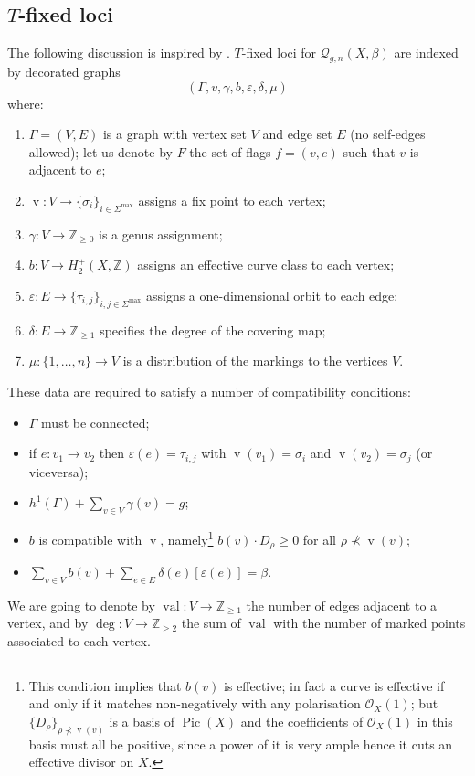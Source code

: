 \documentclass[11pt]{amsart}
\newcommand{\Q}[4]{\mathcal{Q}_{#1,#2}(#3,#4)}
\newcommand{\OO}{\mathcal{O}}
\renewcommand{\to}{\rightarrow}
\newcommand{\Pic}{\operatorname{Pic}}
\newcommand{\val}{\operatorname{val}}
\newcommand{\ZZ}{\mathbb{Z}}
\newcommand{\vv}{\operatorname{v}}
\theoremstyle{definition}
\theoremstyle{definition}
\begin{document}
\subsection{$T$-fixed loci}
The following discussion is inspired by \cite[\S 7.3]{MOP}. $T$-fixed loci for $\Q{g}{n}{X}{\beta}$ are indexed by decorated graphs
\[ \left(\Gamma, v, \gamma, b,\varepsilon,\delta,\mu\right) \]
where:
\begin{enumerate}
 \item $\Gamma=(V,E)$ is a graph with vertex set $V$ and edge set $E$ (no self-edges allowed); let us denote by $F$ the set of flags $f=(v,e)$ such that $v$ is adjacent to $e$;
 \item $\vv\colon V\to \{\sigma_i\}_{i\in\Sigma^\text{max}}$ assigns a fix point to each vertex;
 \item $\gamma\colon V\to \ZZ_{\geq 0}$ is a genus assignment;
 \item $b\colon V\to H^+_2(X,\ZZ)$ assigns an effective curve class to each vertex;
 \item $\varepsilon\colon E\to \{\tau_{i,j}\}_{i,j\in\Sigma^\text{max}}$ assigns a one-dimensional orbit to each edge;
 \item $\delta\colon E\to \ZZ_{\geq1}$ specifies the degree of the covering map;
 \item $\mu\colon \{1,\ldots,n\}\to V$ is a distribution of the markings to the vertices $V$.
\end{enumerate}
These data are required to satisfy a number of compatibility conditions:
\begin{itemize}
 \item $\Gamma$ must be connected;
 \item if $e\colon v_1\to v_2$ then $\varepsilon(e)=\tau_{i,j}$ with $\vv(v_1)=\sigma_i$ and $\vv(v_2)=\sigma_j$ (or viceversa);
 \item $h^1(\Gamma)+\sum_{v\in V} \gamma(v)=g$;
 \item $b$ is compatible with $\vv$, namely\footnote{This condition implies that $b(v)$ is effective; in fact a curve is effective if and only if it matches non-negatively with any polarisation $\OO_X(1)$; but $\{D_\rho\}_{\rho\nprec\vv(v)}$ is a basis of $\Pic(X)$ and the coefficients of $\OO_X(1)$ in this basis must all be positive, since a power of it is very ample hence it cuts an effective divisor on $X$.} $b(v)\cdot D_\rho\geq 0$ for all $\rho\nprec \vv(v)$; 
 \item $\sum_{v\in V}b(v)+\sum_{e\in E}\delta(e)[\varepsilon(e)]=\beta$.
 \end{itemize}
We are going to denote by $\val\colon V\to\ZZ_{\geq1}$ the number of edges adjacent to a vertex, and by $\deg\colon V\to\ZZ_{\geq2}$ the sum of $\val$ with the number of marked points associated to each vertex.
\end{document}
